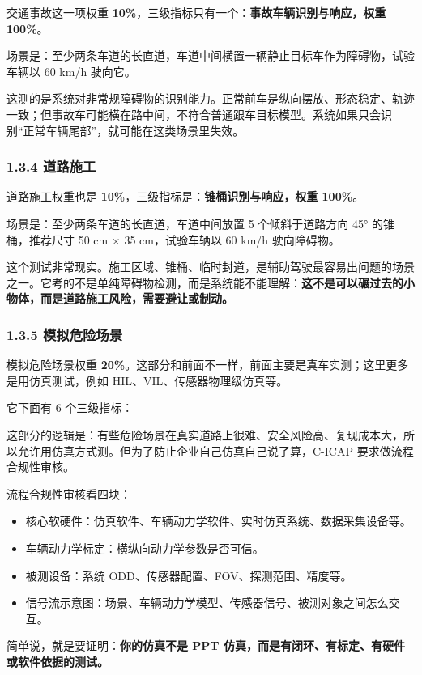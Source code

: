交通事故这一项权重 \textbf{10\%}，三级指标只有一个：\textbf{事故车辆识别与响应，权重 100\%}。

场景是：至少两条车道的长直道，车道中间横置一辆静止目标车作为障碍物，试验车辆以 60 km/h 驶向它。

这测的是系统对非常规障碍物的识别能力。正常前车是纵向摆放、形态稳定、轨迹一致；但事故车可能横在路中间，不符合普通跟车目标模型。系统如果只会识别“正常车辆尾部”，就可能在这类场景里失效。

\subsubsection{1.3.4 道路施工}

道路施工权重也是 \textbf{10\%}，三级指标是：\textbf{锥桶识别与响应，权重 100\%}。

场景是：至少两条车道的长直道，车道中间放置 5 个倾斜于道路方向 45° 的锥桶，推荐尺寸 50 cm × 35 cm，试验车辆以 60 km/h 驶向障碍物。

这个测试非常现实。施工区域、锥桶、临时封道，是辅助驾驶最容易出问题的场景之一。它考的不是单纯障碍物检测，而是系统能不能理解：\textbf{这不是可以碾过去的小物体，而是道路施工风险，需要避让或制动。}

\subsubsection{1.3.5 模拟危险场景}

模拟危险场景权重 \textbf{20\%}。这部分和前面不一样，前面主要是真车实测；这里更多是用仿真测试，例如 HIL、VIL、传感器物理级仿真等。

它下面有 6 个三级指标：

这部分的逻辑是：有些危险场景在真实道路上很难、安全风险高、复现成本大，所以允许用仿真方式测。但为了防止企业自己仿真自己说了算，C-ICAP 要求做流程合规性审核。

流程合规性审核看四块：

\begin{itemize}
  \item 核心软硬件：仿真软件、车辆动力学软件、实时仿真系统、数据采集设备等。
  \item 车辆动力学标定：横纵向动力学参数是否可信。
  \item 被测设备：系统 ODD、传感器配置、FOV、探测范围、精度等。
  \item 信号流示意图：场景、车辆动力学模型、传感器信号、被测对象之间怎么交互。
\end{itemize}

简单说，就是要证明：\textbf{你的仿真不是 PPT 仿真，而是有闭环、有标定、有硬件或软件依据的测试。}

